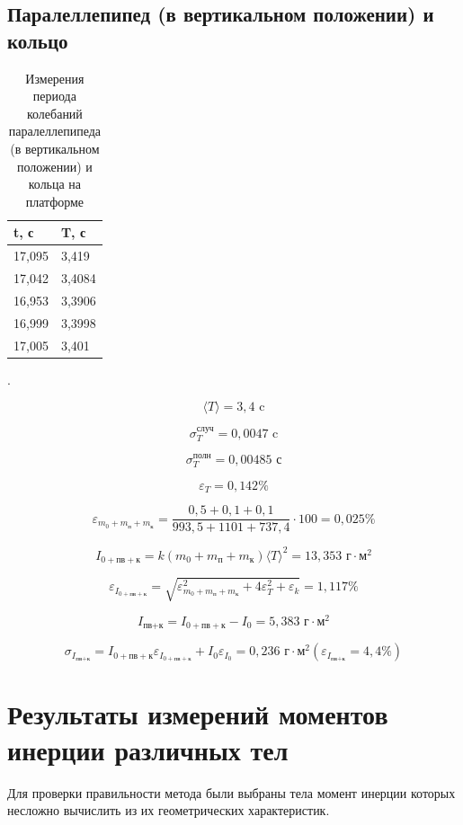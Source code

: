 \documentclass[a4paper, 12pt]{article}
\begin{document}
\subsection*{Паралеллепипед (в вертикальном положении) и кольцо}

\begin{table}
    \centering
    \begin{tabular}{|l|l|}
    \hline
        t, с & T, с \\ \hline
        17,095 & 3,419 \\ \hline
        17,042 & 3,4084 \\ \hline
        16,953 & 3,3906 \\ \hline
        16,999 & 3,3998 \\ \hline
        17,005 & 3,401 \\ \hline
    \end{tabular}
    \caption{Измерения периода колебаний паралеллепипеда (в вертикальном положении) и кольца на платформе}
\end{table}
.

\[ \langle T \rangle = 3,4 \text{ c}\]

\[\sigma_T^{\text{случ}} = 0,0047 \text{ c}\]

\[\sigma_T^{\text{полн}} = 0,00485 \text{ с}\]

\[\varepsilon_T = 0,142\% \]

\[\varepsilon_{m_0+m_\text{п}+m_\text{к}} = \frac{0,5+0,1+0,1}{993,5+1101+737,4} \cdot 100 = 0,025\%\]

\[ I_{0+\text{пв}+\text{к}} = k(m_0+m_\text{п}+m_\text{к}) {\langle T \rangle}^2 = 13,353 \text{ г}\cdot\text{м}^2\]

\[ \varepsilon_{I_{0+\text{пв}+\text{к}}} = \sqrt{\varepsilon_{m_0+m_\text{п}+m_\text{к}}^2 + 4\varepsilon_T^2 + \varepsilon_k} = 1,117\%\]

\[ I_{\text{пв}+\text{к}} = I_{0+\text{пв}+\text{к}} - I_0 = 5,383 \text{ г}\cdot\text{м}^2\]

\[ \sigma_{I_{\text{пв}+\text{к}}} = I_{0+\text{пв}+\text{к}}\varepsilon_{I_{0+\text{пв}+\text{к}}} + I_0\varepsilon_{I_0} = 0,236 \text{ г}\cdot\text{м}^2 (\varepsilon_{I_{\text{пв}+\text{к}}} = 4,4\%) \]

\section*{Результаты измерений моментов инерции различных тел}
Для проверки правильности метода были выбраны тела момент инерции которых несложно вычислить из их геометрических характеристик.
\end{document}
